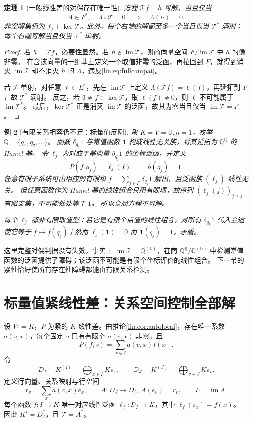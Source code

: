 \documentclass[11pt,a4paper,oneside,openany]{book}
\theoremstyle{lecture}
\newtheorem{theorem}{定理}[section]
\newtheorem{example}[theorem]{例}
\newcommand{\Q}{\mathbb Q}
\newcommand{\im}{\operatorname{im}}
\newcommand{\T}{\mathcal T}
\numberwithin{equation}{section}
\begin{document}
\begin{theorem}[一般线性差的对偶存在唯一性]\label{lin:thm:fullalgebraic}
方程 $\T f=h$ 可解，当且仅当
\begin{equation}\label{lin:eq:fullcompat}
 \Lambda\in F^*,\quad \Lambda\circ\T=0
 \quad\Longrightarrow\quad \Lambda(h)=0.
\end{equation}
非空解集仍为 $f_0+\ker\T$。此外，每个右端的解都至多一个当且仅当 $\T^*$ 满射；每个右端可解当且仅当 $\T^*$ 单射。
\end{theorem}
\begin{proof}
若 $h=\T f$，必要性显然。若 $h\notin\im\T$，则商向量空间 $F/\im\T$ 中 $h$ 的像非零。
在含该向量的一组基上定义一个取值非零的泛函，再拉回到 $F$，就得到消灭 $\im\T$ 却不消灭 $h$ 的 $\Lambda$，违反\eqref{lin:eq:fullcompat}。

若 $\T$ 单射，对任意 $\ell\in E^*$，先在 $\im\T$ 上定义 $\Lambda(\T f)=\ell(f)$，再延拓到 $F$，故 $\T^*$ 满射。
反之，若 $0\ne f\in\ker\T$，取 $\ell(f)\ne0$，则 $\ell$ 不可能属于 $\im\T^*$。
最后，$\ker\T^*$ 正是消灭 $\im\T$ 的泛函，故其为零当且仅当 $\im\T=F$。
\end{proof}

\begin{example}[有限关系相容仍不足：标量值反例]\label{lin:ex:noncompact}
取 $K=V=\Q,n=1$，枚举 $\Q=\{q_1,q_2,\ldots\}$。
函数 $\delta_{q_j}1$ 与常值函数 $\mathbf1$ 构成线性无关族，将其延拓为 $\Q^{\Q}$ 的 Hamel 基。
令 $\ell_j$ 为对应于基向量 $\delta_{q_j}1$ 的坐标泛函，并定义
\[
 P(f,q_j)=\ell_j(f),\qquad h(q_j)=1.
\]
任意有限子系统可由相应的有限和 $f=\sum_{j\in F}\delta_{q_j}1$ 解出，且泛函族 $(\ell_j)$ 线性无关。
但任意函数作为 Hamel 基的线性组合只用有限项，故序列 $(\ell_j(f))_{j\ge1}$ 有限支集，不可能处处等于 $1$。
所以全局方程不可解。

每个 $\ell_j$ 都非有限取值型：若它是有限个点值的线性组合，对所有 $\delta_{q_k}1$ 代入会迫使它等于 $f\mapsto f(q_j)$；然而 $\ell_j(\mathbf1)=0$ 而 $\mathbf1(q_j)=1$，矛盾。
\end{example}
这里完整对偶判据没有失效。事实上 $\im\T=\Q^{(\Q)}$，在商 $\Q^{\Q}/\Q^{(\Q)}$ 中检测常值函数的泛函提供了障碍；该泛函不可能是有限个坐标评价的线性组合。
下一节的紧性恰好使所有存在性障碍都能由有限关系检测。

\section{标量值紧线性差：关系空间控制全部解}\label{lin:sec:scalar}
设 $W=K$，$P$ 为紧的 $K$-线性差。由推论\ref{lin:cor:autolocal}，存在唯一系数 $a(v,x)$，每个固定 $v$ 只有有限个 $a(v,x)$ 非零，且
\begin{equation}\label{lin:eq:rowfinite}
 P(f,v)=\sum_{x\in I}a(v,x)f(x).
\end{equation}
令
\[
 D_I=K^{(I)}=\bigoplus_{x\in I}Ke_x,\qquad
 D_J=K^{(J)}=\bigoplus_{v\in J}Ke_v.
\]
定义行向量、关系映射与行空间
\begin{equation}\label{lin:eq:A}
 r_v=\sum_xa(v,x)e_x,\qquad
 A:D_J\to D_I,\ A(e_v)=r_v,\qquad L=\im A.
\end{equation}
每个函数 $f:I\to K$ 唯一对应线性泛函
$\ell_f:D_I\to K$，其中 $\ell_f(e_x)=f(x)$。
因此 $K^I=D_I^*$，且 $\T=A^*$。
\end{document}

